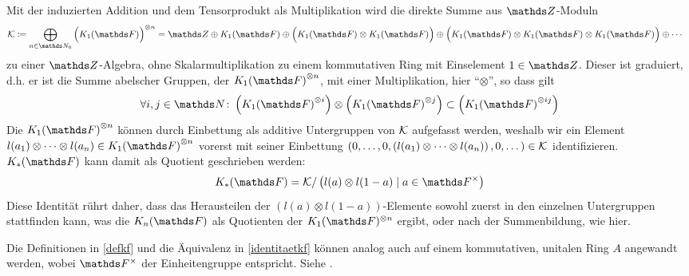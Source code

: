 \documentclass[ngerman,fontsize=11pt, paper=a4, parskip=half, titlepage=true, toc=bib]{scrartcl}
\begin{document}
\begin{Bem}\label{identitaetkf}
  Mit der induzierten Addition und dem Tensorprodukt als
  Multiplikation wird die direkte Summe aus $\Z$-Moduln
  \begin{align*}
    \calK &\coloneqq
            \bigoplus_{n\in\N_0}{\Big(\K_1(\F)\Big)}^{\otimes n}%
                = \Z\oplus\K_1(\F)
                \oplus\Big(\K_1(\F)\otimes\K_1(\F)\Big)
                \oplus\Big(\K_1(\F)\otimes\K_1(\F)\otimes\K_1(\F)\Big)
                \oplus\dotsb
  \end{align*}
  zu einer $\Z$-Algebra, 
  ohne Skalarmultiplikation zu einem kommutativen Ring mit Einselement
  $1\in\Z$.
  Dieser ist graduiert, d.h. er ist die Summe abelscher Gruppen, 
  der ${\K_1(\F)}^{\otimes n}$, mit einer Multiplikation, hier
  \enquote{$\otimes$}, so dass gilt
  \begin{gather*}
    \forall i,j\in \N\colon 
    \left( {\K_1(\F)}^{\otimes i} \right) \otimes
    \left( {\K_1(\F)}^{\otimes j} \right)
    \subset \left( {\K_1(\F)}^{\otimes ij} \right)
  \end{gather*}
  Die ${\KoF}^{\otimes n}$ können durch Einbettung als additive 
  Untergruppen von $\mathcal{K}$ aufgefasst
  werden, weshalb wir ein Element
  $l(a_1)\otimes\dotsb\otimes l(a_n)\in {\KoF}^{\otimes n}$
  vorerst mit seiner Einbettung
  $\left(
    0,\dotsc,0,
    \left(l(a_1)\otimes\dotsb\otimes l(a_n)\right),
    0,\dotsc
  \right)\in\mathcal{K}$
  identifizieren.
  $\KF$ kann damit als Quotient geschrieben werden:
  \begin{gather*}
    \KF = \calK / \left(l(a)\otimes l(1-a)\mid a\in\Fx\right)
  \end{gather*}
  Diese Identität rührt daher, dass das Herausteilen 
  der $(l(a)\otimes l(1-a))$-Elemente sowohl zuerst in den einzelnen
  Untergruppen stattfinden kann, was die $\KnF$ als Quotienten der
  $\KoF^{\otimes n}$ ergibt, 
  oder nach der Summenbildung, wie hier.
\end{Bem}

\begin{Bem}
  Die Definitionen in \ref{defkf} und die Äquivalenz in 
  \ref{identitaetkf} können analog auch auf 
  einem kommutativen, unitalen Ring $A$ angewandt werden,
  wobei $\Fx$ der Einheitengruppe entspricht. Siehe \cite{kerzdipl,kerz}.
\end{Bem}
\end{document}
